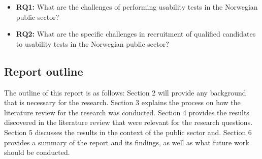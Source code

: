 \begin{itemize}
    \item \textbf{RQ1:} What are the challenges of performing usability tests in the Norwegian public sector?
    \item \textbf{RQ2:} What are the specific challenges in recruitment of qualified candidates to usability tests in the Norwegian public sector?
\end{itemize}

\subsection{Report outline}
The outline of this report is as follows: Section 2 will provide any background that is necessary for the research. Section 3 explains the process on how the literature review for the research was conducted. Section 4 provides the results discovered in the literature review that were relevant for the research questions. Section 5 discusses the results in the context of the public sector and. Section 6 provides a summary of the report and its findings, as well as what future work should be conducted.